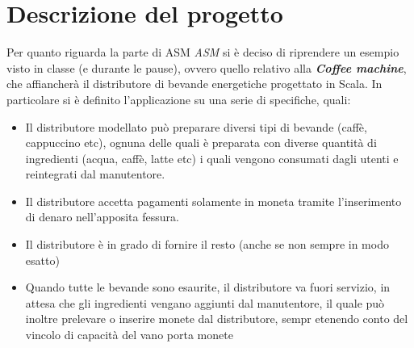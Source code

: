 \section{Descrizione del progetto}
Per quanto riguarda la parte di ASM  \textit{ASM} si è deciso di riprendere un esempio visto in classe (e durante le pause), ovvero quello relativo alla \textit{\textbf{Coffee machine}}, che affiancherà il distributore di bevande energetiche progettato in Scala.
In particolare si è definito l'applicazione su una serie di specifiche, quali:
\begin{itemize}
	\item Il distributore modellato può preparare diversi tipi di bevande (caffè, cappuccino etc), ognuna delle quali è preparata con diverse quantità di ingredienti (acqua, caffè, latte etc) i quali vengono consumati dagli utenti e reintegrati dal manutentore.
	\item Il distributore accetta pagamenti solamente in moneta tramite l'inserimento di denaro nell'apposita fessura.
	\item Il distributore è in grado di fornire il resto (anche se non sempre in modo esatto)
	\item Quando tutte le bevande sono esaurite, il distributore va fuori servizio, in attesa che gli ingredienti vengano aggiunti dal manutentore, il quale può inoltre prelevare o inserire monete dal distributore, sempr etenendo conto del vincolo di capacità del vano porta monete
\end{itemize}
	

